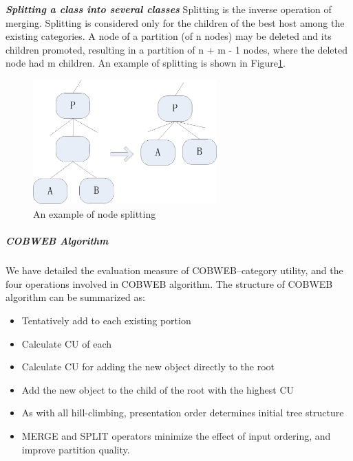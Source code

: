\textbf{\emph{Splitting a class into several classes}} Splitting is the inverse operation of merging. Splitting is considered only for the children of the best host among the existing categories. A node of a partition (of n nodes) may be deleted and its children promoted, resulting in a partition of n + m - 1 nodes, where the deleted node had m children\cite{fisher1987knowledge}. An example of splitting is shown in Figure\ref{Fig:split}. 

\begin{figure}[!ht]
    \centering
    \includegraphics[width=200pt]{../images/split.jpg}
    \caption{An example of node splitting}
    \label{Fig:split}
\end{figure}

\subparagraph {COBWEB Algorithm}
We have detailed the evaluation measure of COBWEB--category utility, and the four operations involved in COBWEB algorithm. The structure of COBWEB algorithm can be summarized as:
\begin{itemize}\setlength{\itemsep}{0.01pt}
\item Tentatively add to each existing portion
\item Calculate CU of each
\item Calculate CU for adding the new object directly to the root
\item Add the new object to the child of the root with the highest CU
\item As with all hill-climbing, presentation order determines initial tree structure
\item MERGE and SPLIT operators minimize the effect of input ordering, and improve partition quality.
\end{itemize}


